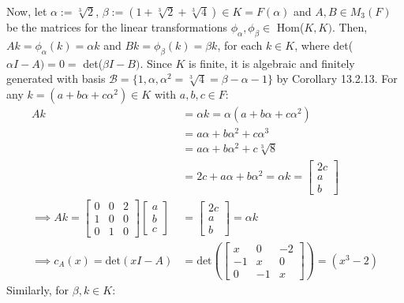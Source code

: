 Now, let $\alpha := \sqrt[3]{2}$, $\beta := (1 + \sqrt[3]{2} + \sqrt[3]{4}) \in K = F(\alpha)$ and $A, B \in M_3(F)$ be the matrices for the linear transformations $\phi_\alpha, \phi_\beta \in$ Hom($K, K)$. Then, $Ak = \phi_\alpha(k) = \alpha k$ and $Bk = \phi_\beta(k) = \beta k$, for each $k \in K$, where det($\alpha I - A) = 0 =$ det($\beta I - B)$. Since $K$ is finite, it is algebraic and finitely generated with basis $\mathcal{B} = \{1, \alpha, \alpha^2 = \sqrt[3]{4} = \beta - \alpha - 1\}$ by Corollary 13.2.13. For any $k = (a + b\alpha + c\alpha^2) \in K$ with $a, b, c \in F$:
\begin{align*}
    Ak &= \alpha k = \alpha(a + b\alpha + c\alpha^2) \\
    &= a\alpha + b\alpha^2 + c\alpha^3 \\
    &= a\alpha + b\alpha^2 + c\sqrt[3]{8} \\
    &= 2c + a\alpha + b\alpha^2 = \alpha k = \left[\begin{array}{c}
        2c \\
        a \\
        b
    \end{array}\right] \\
    \implies Ak = \left[\begin{array}{ccc}
    0 & 0 & 2  \\
    1 & 0 & 0 \\
    0 & 1 & 0
\end{array}\right]\left[ \begin{array}{c}
    a  \\
    b \\
    c
\end{array}\right] &= \left[\begin{array}{c}
        2c \\
        a \\
        b
    \end{array}\right] = \alpha k \\
    \implies c_A(x) = \text{det}(xI - A) &= \text{det}\left(\left[\begin{array}{ccc}
    x & 0 & -2  \\
    -1 & x & 0 \\
    0 & -1 & x
\end{array}\right]\right) = (x^3 - 2)
\end{align*}
Similarly, for $\beta, k \in K$:
